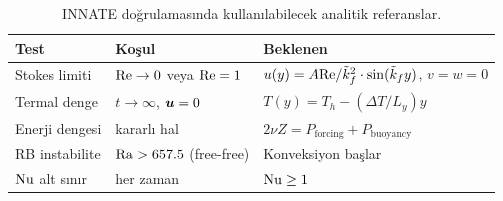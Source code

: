 \begin{table}[H]
\centering
\caption{INNATE doğrulamasında kullanılabilecek analitik referanslar.}
\label{tab:analitik_referans}
\begin{tabular}{lll}
\toprule
\textbf{Test} & \textbf{Koşul} & \textbf{Beklenen} \\
\midrule
Stokes limiti      & $\mathrm{Re} \to 0$ veya $\mathrm{Re} = 1$ & $u(y) = A\mathrm{Re}/\tilde{k}_f^2 \cdot \sin(\tilde{k}_f y)$, $v = w = 0$ \\
Termal denge       & $t \to \infty$, $\bm{u} = 0$ & $T(y) = T_h - (\Delta T/L_y) y$ \\
Enerji dengesi     & kararlı hal               & $2\nu Z = P_{\text{forcing}} + P_{\text{buoyancy}}$ \\
RB instabilite     & $\mathrm{Ra} > 657.5$ (free-free)    & Konveksiyon başlar \\
$\mathrm{Nu}$ alt sınır & her zaman & $\mathrm{Nu} \geq 1$ \\
\bottomrule
\end{tabular}
\end{table}
